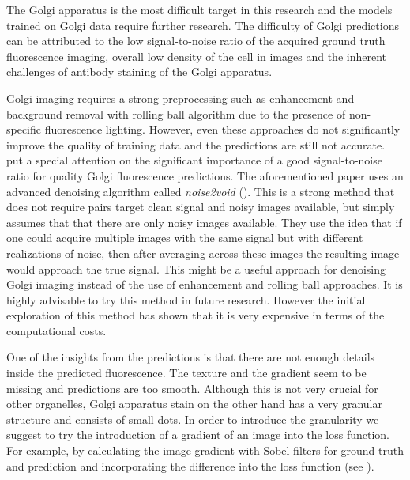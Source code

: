 The Golgi apparatus is the most difficult target in this research and the models trained on Golgi data require further research. The difficulty of Golgi predictions can be attributed to the low signal-to-noise ratio of the acquired ground truth fluorescence imaging, overall low density of the cell in images and the inherent challenges of antibody staining of the Golgi apparatus. 

Golgi imaging requires a strong preprocessing such as enhancement and background removal with rolling ball algorithm due to the presence of non-specific fluorescence lighting. However, even these approaches do not significantly improve the quality of training data and the predictions are still not accurate. \cite{Cheng_2021} put a special attention on the significant importance of a good signal-to-noise ratio for quality Golgi fluorescence predictions. The aforementioned paper uses an advanced denoising algorithm called \textit{noise2void} (\cite{noise2void}). This is a strong method that does not require pairs target clean signal and noisy images available, but simply assumes that that there are only noisy images available. They use the idea that if one could acquire multiple images with the same signal but with different realizations of noise, then after averaging across these images the resulting image would approach the true signal. This might be a useful approach for denoising Golgi imaging instead of the use of enhancement and rolling ball approaches. It is highly advisable to try this method in future research. However the initial exploration of this method has shown that it is very expensive in terms of the computational costs. 

One of the insights from the predictions is that there are not enough details inside the predicted fluorescence. The texture and the gradient seem to be missing and predictions are too smooth. Although this is not very crucial for other organelles, Golgi apparatus stain on the other hand has a very granular structure and consists of small dots. In order to introduce the granularity we suggest to try the introduction of a gradient of an image into the loss function. For example, by calculating the image gradient with Sobel filters for ground truth and prediction and incorporating the difference into the loss function (see \cite{Yao_2016}).